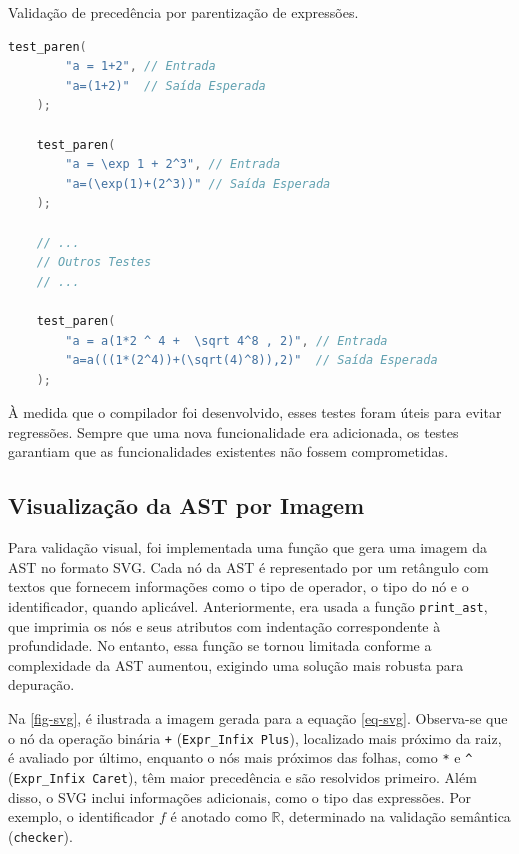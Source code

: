 \begin{codigo}[H]
    \caption{\small Validação de precedência por parentização de expressões.}
        \label{cod-test-paren}
  \begin{lstlisting}[language = C]
    test_paren(
        "a = 1+2", // Entrada
        "a=(1+2)"  // Saída Esperada
    );

    test_paren(
        "a = \exp 1 + 2^3", // Entrada
        "a=(\exp(1)+(2^3))" // Saída Esperada
    );

    // ...
    // Outros Testes
    // ...

    test_paren(
        "a = a(1*2 ^ 4 +  \sqrt 4^8 , 2)", // Entrada
        "a=a(((1*(2^4))+(\sqrt(4)^8)),2)"  // Saída Esperada
    );
  \end{lstlisting}
\end{codigo}

À medida que o compilador foi desenvolvido, esses testes foram úteis para evitar regressões. Sempre que uma nova funcionalidade era adicionada, os testes garantiam que as funcionalidades existentes não fossem comprometidas.




\subsection{Visualização da AST por Imagem} \label{subsection-svg}

Para validação visual, foi implementada uma função que gera uma imagem da AST no formato SVG. Cada nó da AST é representado por um retângulo com textos que fornecem informações como o tipo de operador, o tipo do nó e o identificador, quando aplicável. Anteriormente, era usada a função \texttt{print\_ast}, que imprimia os nós e seus atributos com indentação correspondente à profundidade. No entanto, essa função se tornou limitada conforme a complexidade da AST aumentou, exigindo uma solução mais robusta para depuração.

Na \autoref{fig-svg}, é ilustrada a imagem gerada para a equação \autoref{eq-svg}. Observa-se que o nó da operação binária \texttt{+} (\verb"Expr_Infix Plus"), localizado mais próximo da raiz, é avaliado por último, enquanto o nós mais próximos das folhas, como \texttt{*} e \texttt{\^} (\verb"Expr_Infix Caret"), têm maior precedência e são resolvidos primeiro. Além disso, o SVG inclui informações adicionais, como o tipo das expressões. Por exemplo, o identificador \( f \) é anotado como \( \mathbb{R} \), determinado na validação semântica (\texttt{checker}).

